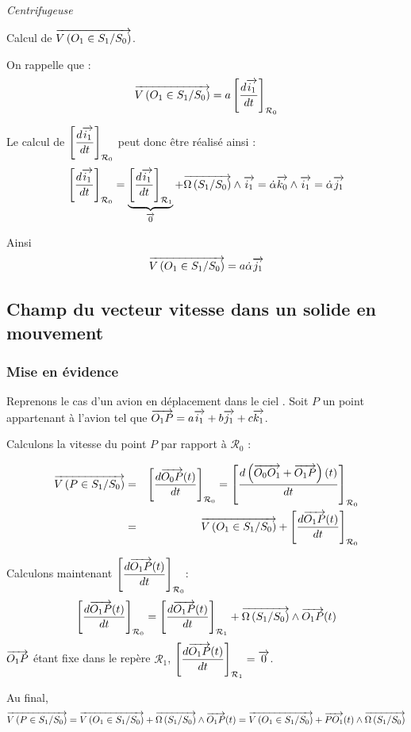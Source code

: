 \documentclass[10pt,oneside]{article}
\begin{document}
\begin{exemple}
\textit{Centrifugeuse}

Calcul de $\overrightarrow{V\left( {O_1} \in {S_1}/{S_0}\right)}$.

On rappelle que :
$$
\overrightarrow{V\left( {O_1} \in {S_1}/{S_0}\right)} 
= a \left[\dfrac{d  \overrightarrow{i_1} }{dt}\right]_{\mathcal{R}_0}
$$

Le calcul de $\left[\dfrac{d  \overrightarrow{i_1} }{dt}\right]_{\mathcal{R}_0}$ peut donc être réalisé ainsi : 
$$ 
\left[\dfrac{d  \overrightarrow{i_1} }{dt}\right]_{\mathcal{R}_0} = 
\underbrace{\left[\dfrac{d  \overrightarrow{i_1} }{dt}\right]_{\mathcal{R}_1}}_{\overrightarrow{0}} + \overrightarrow{\Omega\left( {S_1}/{S_0}\right)}\wedge \overrightarrow{i_1}
=\dot{\alpha}\overrightarrow{k_0}  \wedge \overrightarrow{i_1}
=\dot{\alpha} \overrightarrow{j_1}
$$

Ainsi 
$$
\overrightarrow{V\left( {O_1} \in {S_1}/{S_0}\right)} 
= a \dot{\alpha} \overrightarrow{j_1}
$$
\end{exemple}

\subsection{Champ du vecteur vitesse dans un solide en mouvement}

\subsubsection{Mise en évidence}
Reprenons le cas d'un avion en déplacement dans le ciel . Soit $P$ un point appartenant à l'avion tel que $\overrightarrow{O_1P} = a\overrightarrow{i_1} + b\overrightarrow{j_1} + c\overrightarrow{k_1}$. 

Calculons la vitesse du point $P$ par rapport à $\mathcal{R}_0$ :

\begin{eqnarray*}
\overrightarrow{V\left( {P} \in {S_1}/{S_0}\right)} & = &\left[\dfrac{d\overrightarrow{O_0 P}(t)}{dt}\right]_{\mathcal{R}_0}
= \left[\dfrac{d\left( \overrightarrow{O_0 O_1} + \overrightarrow{O_1P}\right)(t)}{dt}\right]_{\mathcal{R}_0} \\
&=&\overrightarrow{V\left( {O_1} \in {S_1}/{S_0}\right)}+\left[\dfrac{d\overrightarrow{O_1 P}(t)}{dt}\right]_{\mathcal{R}_0} \\
\end{eqnarray*}

Calculons maintenant $\left[\dfrac{d\overrightarrow{O_1 P}(t)}{dt}\right]_{\mathcal{R}_0}$:
$$
\left[\dfrac{d\overrightarrow{O_1 P}(t)}{dt}\right]_{\mathcal{R}_0} = 
\left[\dfrac{d\overrightarrow{O_1 P}(t)}{dt}\right]_{\mathcal{R}_1} 
+ \overrightarrow{\Omega\left( {S_1}/{S_0}\right)} \wedge \overrightarrow{O_1 P}(t)
$$
$\overrightarrow{O_1 P}$ étant fixe dans le repère $\mathcal{R}_1$, $\left[\dfrac{d\overrightarrow{O_1 P}(t)}{dt}\right]_{\mathcal{R}_1}=\overrightarrow{0}$.

Au final, 
$$
\overrightarrow{V\left( {P} \in {S_1}/{S_0}\right)} = \overrightarrow{V\left( {O_1} \in {S_1}/{S_0}\right)}+
\overrightarrow{\Omega\left( {S_1}/{S_0}\right)} \wedge \overrightarrow{O_1 P}(t)
= \overrightarrow{V\left( {O_1} \in {S_1}/{S_0}\right)}+
 \overrightarrow{P O_1}(t) \wedge \overrightarrow{\Omega\left( {S_1}/{S_0}\right)} 
$$
\end{document}
